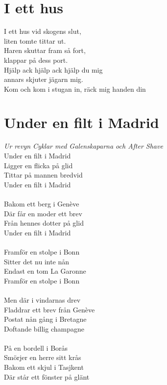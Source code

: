 \section{I ett hus}
I ett hus vid skogens slut,\\
liten tomte tittar ut.\\
Haren skuttar fram så fort,\\
klappar på dess port.\\
Hjälp ack hjälp ack hjälp du mig\\
annars skjuter jägarn mig.\\
Kom och kom i stugan in,
räck mig handen din\\

\section{Under en filt i Madrid}
\textit{Ur revyn Cyklar med Galenskaparna och After Shave}
\vspace{2mm}\\
Under en filt i Madrid\\
Ligger en flicka på glid\\
Tittar på mannen bredvid\\
Under en filt i Madrid\\
\\
Bakom ett berg i Genève\\
Där får en moder ett brev\\
Från hennes dotter på glid\\
Under en filt i Madrid\\
\\
Framför en stolpe i Bonn\\
Sitter det nu inte nån\\
Endast en tom La Garonne\\
Framför en stolpe i Bonn\\
\\
Men där i vindarnas drev\\
Fladdrar ett brev från Genève\\
Postat nån gång i Bretagne\\
Doftande billig champagne\\
\\
På en bordell i Borås\\
Smörjer en herre sitt krås\\
Bakom ett skjul i Tasjkent\\
Där står ett fönster på glänt\\
\\

